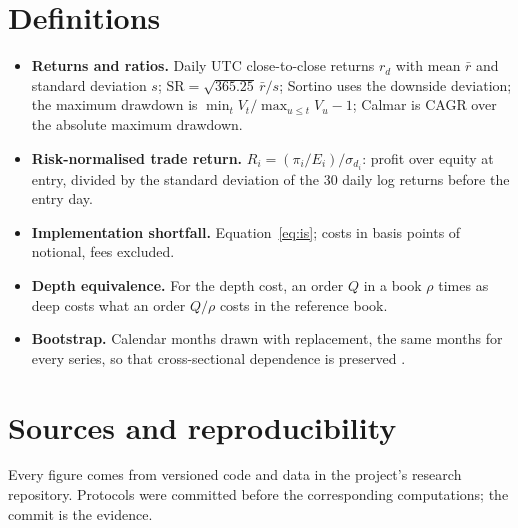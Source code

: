 \documentclass[11pt,a4paper]{article}
\begin{document}
\section{Definitions}\label{app:defs}
\begin{itemize}
\item \textbf{Returns and ratios.} Daily UTC close-to-close returns $r_d$ with mean $\bar r$ and standard deviation $s$;
  $\mathrm{SR}=\sqrt{365.25}\,\bar r/s$; Sortino uses the downside deviation; the maximum drawdown is $\min_t V_t/\max_{u\le t}V_u-1$;
  Calmar is CAGR over the absolute maximum drawdown.
\item \textbf{Risk-normalised trade return.} $R_i=(\pi_i/E_i)/\sigma_{d_i}$: profit over equity at entry, divided by the standard
  deviation of the 30 daily log returns before the entry day.
\item \textbf{Implementation shortfall.} Equation~\eqref{eq:is}; costs in basis points of notional, fees excluded.
\item \textbf{Depth equivalence.} For the depth cost, an order $Q$ in a book $\rho$ times as deep costs what an order $Q/\rho$ costs in
  the reference book.
\item \textbf{Bootstrap.} Calendar months drawn with replacement, the same months for every series, so that cross-sectional
  dependence is preserved \citep{kunsch1989}.
\end{itemize}

\section{Sources and reproducibility}\label{app:sources}
Every figure comes from versioned code and data in the project's research repository. Protocols were committed before the
corresponding computations; the commit is the evidence.
\end{document}
